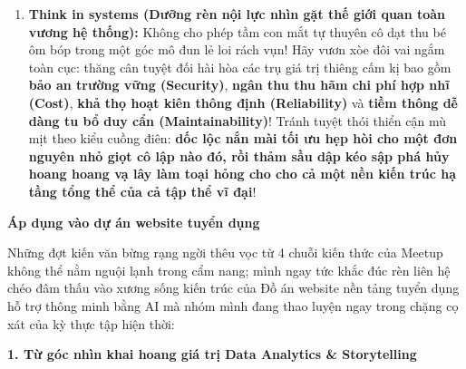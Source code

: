 \begin{enumerate}
  \begin{itemize}
  \tightlist
  \item
    Một thành tấu, kết quả thuật toán \textbf{kỹ thuật sâu sắc nhất
    thiết cần được bảo toàn tài ba diễn thuyết ra thành thông điệp giao
    tiếp tường rành, giản dị dễ hấp thu} cho đồng nghiệp đa bộ phận!
  \item
    Toàn thể \textbf{tập thể tổ (Team) làm việc cần gặt sự đồng tình
    hiểu rọ cơ ngời luồng dữ liệu kiến trúc của nhau}, kiên định triệt
    phá bức tường kiêu căng khinh miệt cản ngăn ranh giới Dev và Ops!
  \item
    Và những người hưng \textbf{thuyết khách thương nghiệp cùng người
    truy nã đích đầu cuối (End users) hoàn toàn khát khao nhận thâu về
    lời giải trình, minh giải trác tuyệt tường minh} cho những thành quả
    chiết xuất từ hạ tầng hệ tư duy sâu thẳm mà chúng ta dệt dâng cống
    cho họ!
  \end{itemize}
\item
  \textbf{Think in systems (Dưỡng rèn nội lực nhìn gặt thế giới quan
  toàn vương hệ thống):} Không cho phép tầm con mắt tự thuyên cô dạt thu
  bé ôm bóp trong một góc mô đun lẻ loi rách vụn! Hãy vươn xòe đôi vai
  ngắm toàn cục: thăng cân tuyệt đối hài hòa các trụ giá trị thiêng cấm
  kị bao gồm \textbf{bảo an trường vững (Security)}, \textbf{ngân thu
  thu hãm chi phí hợp nhĩ (Cost)}, \textbf{khả thọ hoạt kiên thông định
  (Reliability)} và \textbf{tiềm thông dễ dàng tu bổ duy cẩn
  (Maintainability)}! Tránh tuyệt thói thiển cận mù mịt theo kiểu cuồng
  điên: \textbf{dốc lộc nắn mài tối ưu hẹp hòi cho một đơn nguyên nhỏ
  giọt cô lập nào đó, rồi thảm sầu dập kéo sập phá hủy hoang hoang vạ
  lây làm toại hỏng cho cho cả một nền kiến trúc hạ tầng tổng thể của cả
  tập thể vĩ đại}!
\end{enumerate}

\vspace{0.5em}\noindent\textbf{Áp dụng vào dự án website tuyển
dụng}\par

Những đợt kiến văn bừng rạng ngời thêu vọc từ 4 chuỗi kiến thức của
Meetup không thể nằm nguội lạnh trong cẩm nang; mình ngay tức khắc đúc
rèn liên hệ chéo đâm thấu vào xương sống kiến trúc của Đồ án website nền
tảng tuyển dụng hỗ trợ thông minh bằng AI mà nhóm mình đang thao luyện
ngay trong chặng cọ xát của kỳ thực tập hiện thời:

\vspace{0.5em}\noindent\textbf{1. Từ góc nhìn khai hoang giá trị Data Analytics \&
Storytelling}\par

